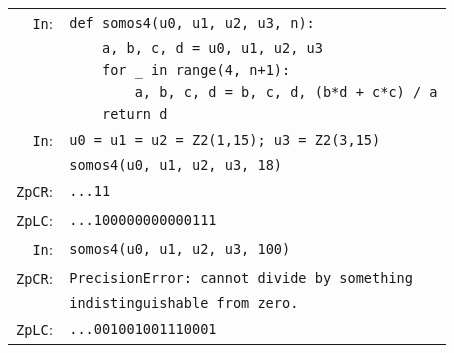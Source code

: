 \documentclass[sigconf]{acmart}
\newcommand{\cIn}{{\color{input} \tt \phantom{Zp}In}:}
\newcommand{\cZpCR}{{\color{output} \tt ZpCR}:}
\newcommand{\cZpFP}{{\color{output} \tt ZpFP}:}
\newcommand{\cZpLC}{{\color{output} \tt ZpLC}:}
\theoremstyle{definition}
\begin{document}
\smallskip

{\noindent \small
\begin{tabular}{rl}
\cIn
 & {\color{keyword}\verb?def?}\verb? ?{\color{function}\verb?somos4?}\verb?(u0, u1, u2, u3, n):? \\
 & \verb?    a, b, c, d = u0, u1, u2, u3? \\
 & \verb?    ?{\color{keyword}\verb?for?}\verb? _ in ?{\color{keyword}\verb?range?}\verb?(4, n+1):? \\
 & \verb?        a, b, c, d = b, c, d, (b*d + c*c) / a? \\
 & \verb?    ?{\color{keyword}\verb?return?}\verb? d? \\
\cIn
 & \verb?u0 = u1 = u2 = ?{\color{ring}\verb?Z2?}\verb?(1,15); u3 = ?{\color{ring}\verb?Z2?}\verb?(3,15)? \\
 & {\color{function}\verb?somos4?}\verb?(u0, u1, u2, u3, 18)? \\
\cZpCR
 & \verb?...11? \\
\cZpLC
 & \verb?...100000000000111? \\
\cIn
 & {\color{function}\verb?somos4?}\verb?(u0, u1, u2, u3, 100)? \\
\cZpCR
 & {\color{error}\verb?PrecisionError?}\verb?: cannot divide by something?\\
 &\verb?indistinguishable from zero.? \\
\cZpLC
 & \verb?...001001001110001? \\
\end{tabular}}
\end{document}
